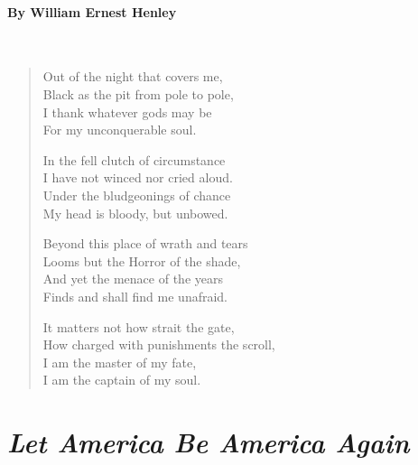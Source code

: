 \documentclass[12pt, openany, letterpaper]{memoir}
\begin{document}
\paragraph{By William Ernest Henley}~
\begin{verse}
	Out of the night that covers me,\\
	\hspace{1em}Black as the pit from pole to pole,\\
	I thank whatever gods may be\\
	\hspace{1em}For my unconquerable soul.
	
	In the fell clutch of circumstance\\
	\hspace{1em}I have not winced nor cried aloud.\\
	Under the bludgeonings of chance\\
	\hspace{1em}My head is bloody, but unbowed.
	
	Beyond this place of wrath and tears\\
	\hspace{1em}Looms but the Horror of the shade,\\
	And yet the menace of the years\\
	\hspace{1em}Finds and shall find me unafraid.
	
	It matters not how strait the gate,\\
	\hspace{1em}How charged with punishments the scroll,\\
	I am the master of my fate,\\
	\hspace{1em}I am the captain of my soul.
\end{verse}

\newpage
\section*{\emph{Let America Be America Again}}
\end{document}
